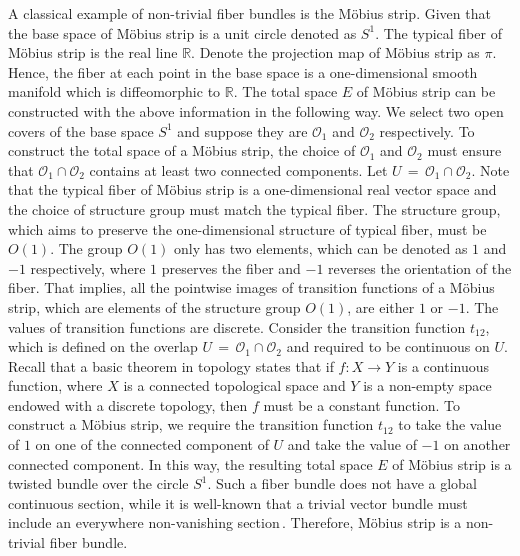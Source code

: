 \par A classical example of non-trivial fiber bundles is the M\"{o}bius strip. Given that the base space of M\"{o}bius strip is a unit circle denoted as $S^{1}$. The typical fiber of M\"{o}bius strip is the real line $\mathbb{R}$. Denote the projection map of M\"{o}bius strip as $\pi$. Hence, the fiber at each point in the base space is a one-dimensional smooth manifold which is diffeomorphic to $\mathbb{R}$. The total space $E$ of M\"{o}bius strip can be constructed with the above information in the following way. We select two open covers of the base space $S^{1}$ and suppose they are $\mathcal{O}_{1}$ and $\mathcal{O}_{2}$ respectively. To construct the total space of a M\"{o}bius strip, the choice of $\mathcal{O}_{1}$ and $\mathcal{O}_{2}$ must ensure that $\mathcal{O}_{1}\cap\mathcal{O}_{2}$ contains at least two connected components. Let $U\,=\,\mathcal{O}_{1}\cap\mathcal{O}_{2}$. Note that the typical fiber of M\"{o}bius strip is a one-dimensional real vector space and the choice of structure group must match the typical fiber. The structure group, which aims to preserve the one-dimensional structure of typical fiber, must be $O\left(1\right)$. The group $O\left(1\right)$ only has two elements, which can be denoted as $1$ and $-1$ respectively, where $1$ preserves the fiber and $-1$ reverses the orientation of the fiber. That implies, all the pointwise images of transition functions of a M\"{o}bius strip, which are elements of the structure group $O\left(1\right)$, are either $1$ or $-1$. The values of transition functions are discrete. Consider the transition function $t_{12}$, which is defined on the overlap $U\,=\,\mathcal{O}_{1}\cap\mathcal{O}_{2}$ and required to be continuous on $U$. Recall that a basic theorem in topology states that if $f:X\rightarrow Y$ is a continuous function, where $X$ is a connected topological space and $Y$ is a non-empty space endowed with a discrete topology, then $f$ must be a constant function. To construct a M\"{o}bius strip, we require the transition function $t_{12}$ to take the value of $1$ on one of the connected component of $U$ and take the value of $-1$ on another connected component. In this way, the resulting total space $E$ of M\"{o}bius strip is a twisted bundle over the circle $S^{1}$. Such a fiber bundle does not have a global continuous section, while it is well-known that a trivial vector bundle must include an everywhere non-vanishing section\,\cite{milnor1974characteristic}. Therefore, M\"{o}bius strip is a non-trivial fiber bundle. 

